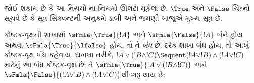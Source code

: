 જોઈ શકાય છે કે આ નિયમો ના નિયમો ઊલટા
મૂકેલા છે. $\True$ અને $\False$ ચિહ્નો સૂચવે છે કે
સૂત્ર સિક્વન્ટની અનુક્રમે ડાબી અને જમણી
બાજુએ મુખ્ય સૂત્ર છે.

કોષ્ટક-વૃક્ષની શાખામાં
$\sFmla{\True}{!A}$ અને $\sFmla{\False}{!A}$
બંને હોય અથવા $\sFmla{\True}{\lfalse}$ હોય,
તો તે \emph{બંધ} છે. દરેક શાખા બંધ
હોય, તો આખું કોષ્ટક-વૃક્ષ બંધ કહેવાય.
દાખલા તરીકે,
$!A \lor (!B \land !C) \Sequent (!A \lor !B) \land
(!A \lor !C)$ માટેનું આ બંધ કોષ્ટક-વૃક્ષ છે;
તે $\sFmla{\True}{!A \lor (!B \land !C)}$
અને $\sFmla{\False}{(!A \lor !B) \land (!A \lor !C)}$થી
શરૂ થાય છે:
